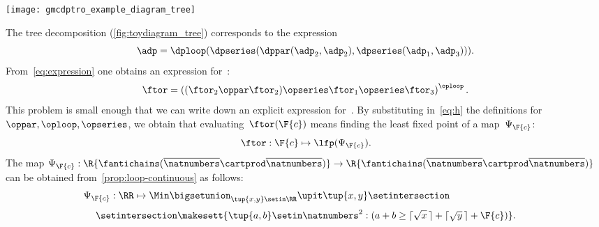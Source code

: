 \begin{marginfigure}
    \texttt{[image: gmcdptro\_example\_diagram\_tree]}
    \caption{}
    \label{fig:toydiagram_tree}
\end{marginfigure}

The tree decomposition (\cref{fig:toydiagram_tree}) corresponds to the expression
%
\begin{equation}
    \adp=\dploop(\dpseries(\dppar(\adp_{2},\adp_{2}),\dpseries(\adp_{1},\adp_{3}))).
    \label{eq:expression}
\end{equation}
%
From~\cref{eq:expression} one obtains an expression for~\ftor:
%
\begin{equation}
    \ftor=\left((\ftor_{2}\oppar\ftor_{2})\opseries\ftor_{1}\opseries\ftor_{3}\right)^{\oploop}.
    \label{eq:h}
\end{equation}
%
This problem is small enough that we can write down an explicit expression for~\ftor.
By substituting in~\cref{eq:h} the definitions for $\oppar, \oploop, \opseries$, we obtain that evaluating~$\ftor(\F{c})$ means finding the least fixed point of a map~$\Psi_{\F{c}}$:
%
\begin{equation}
    \ftor:\F{c}\mapsto\lfp(\Psi_{\F{c}}).
\end{equation}
%
The map $\Psi_{\F{c}}:\R{\fantichains(\overline{\natnumbers}\cartprod\overline{\natnumbers})}\rightarrow\R{\fantichains(\overline{\natnumbers}\cartprod\overline{\natnumbers})}$ can be obtained from~\cref{prop:loop-continuous} as follows:
%
\begin{equation}
    \Psi_{\F{c}}:\RR\mapsto\Min\bigsetunion_{\tup{ x,y} \setin\RR}\upit\tup{ x,y} \setintersection\qquad\qquad\qquad\qquad
\end{equation}
%
\begin{equation}
    \setintersection \makesett{
        \tup{ a,b} \setin\natnumbers^{2}:
        (
        a+b\geq\lceil\sqrt{x}\,\rceil+\lceil\sqrt{y}\,\rceil+\F{c}
        )
    }.
\end{equation}
%

